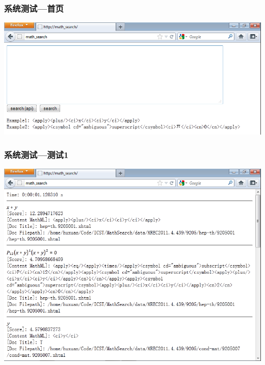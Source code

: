     \begin{frame}
        \frametitle{系统测试---首页}
        \begin{center}
            \includegraphics[width=.8\paperwidth]{pic/test_index.png}
        \end{center}
    \end{frame}

    \begin{frame}
        \frametitle{系统测试---测试1}
        \begin{center}
            \includegraphics[width=.7\paperwidth]{pic/test1.png}
        \end{center}
    \end{frame}

